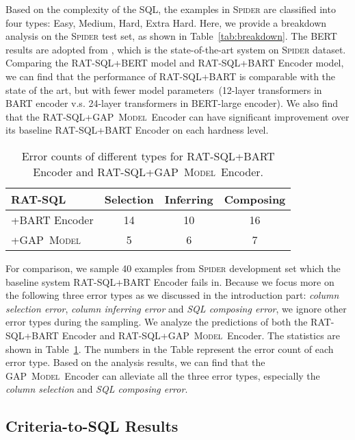 \documentclass[letterpaper]{article} \usepackage{aaai21}  \usepackage{times}  \usepackage{helvet} \usepackage{courier}  \usepackage[hyphens]{url}  \usepackage{graphicx} \usepackage{booktabs}
\newcommand{\modelnamelm}{\textsc{GAP~Model}}
\begin{document}
Based on the complexity of the SQL, the examples in \textsc{Spider} are classified into four types: Easy, Medium, Hard, Extra Hard.
Here, we provide a breakdown analysis on the \textsc{Spider} test set, as shown in Table~\ref{tab:breakdown}.
The BERT results are adopted from \citet{wang2019rat}, which is the state-of-the-art system on \textsc{Spider} dataset.
Comparing the RAT-SQL+BERT model and RAT-SQL+BART Encoder model, we can find that the performance of RAT-SQL+BART is comparable with the state of the art, but with fewer model parameters~(12-layer transformers in BART encoder v.s. 24-layer transformers in BERT-large encoder).
We also find that the RAT-SQL+\modelnamelm~Encoder can have significant improvement over its baseline RAT-SQL+BART Encoder on each hardness level.

\begin{table}[t]
  \centering
  \small
    \begin{tabular}{lccc}
    \toprule
    RAT-SQL & \multicolumn{1}{l}{Selection} & \multicolumn{1}{l}{Inferring} & \multicolumn{1}{l}{Composing} \\
    \midrule
     +BART Encoder & 14 & 10 & 16 \\
     +\modelnamelm & 5 & 6 & 7  \\
    \bottomrule
    \end{tabular}\caption{Error counts of different types for RAT-SQL+BART Encoder and RAT-SQL+\modelnamelm~Encoder.} 
  \label{tab:errorstat}\end{table}

For comparison, we sample 40 examples from \textsc{Spider} development set which the baseline system RAT-SQL+BART Encoder fails in.
Because we focus more on the following three error types as we discussed in the introduction part: \textit{column selection error}, \textit{column inferring error} and \textit{SQL composing error}, we ignore other error types during the sampling.
We analyze the predictions of both the RAT-SQL+BART Encoder and RAT-SQL+\modelnamelm~Encoder.
The statistics are shown in Table~\ref{tab:errorstat}.
The numbers in the Table represent the error count of each error type.
Based on the analysis results, we can find that the \modelnamelm~Encoder can alleviate all the three error types, especially the \textit{column selection} and \textit{SQL composing error}.

\subsection{Criteria-to-SQL Results}
\end{document}

